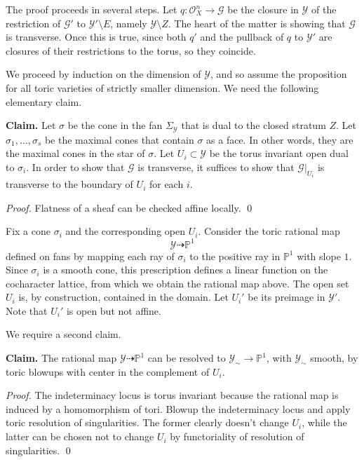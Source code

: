 \documentclass[11pt]{amsart}
\theoremstyle{definition}
\theoremstyle{definition}
\newcommand{\cG}{\mathcal{G}}
\newcommand{\cY}{\mathcal{Y}}
\newcommand{\cal}{\mathcal}
\def\cY{{\cal Y}}
\begin{document}
The proof proceeds in several steps. Let $q \colon \mathcal{O}_X^n\rightarrow \mathcal G$ be the closure in $\cY$ of the restriction of $\cG'$ to $\mathcal Y'\setminus E$, namely $\cY\setminus Z$. The heart of the matter is showing that $\mathcal G$ is transverse. Once this is true, since both $q'$ and the pullback of $q$ to $\mathcal Y'$ are closures of their restrictions to the torus, so they coincide. 

We proceed by induction on the dimension of $\cY$, and so assume the proposition for all toric varieties of strictly smaller dimension. We need the following elementary claim.

\noindent
{\bf Claim.} Let $\sigma$ be the cone in the fan $\Sigma_{\mathcal Y}$ that is dual to the closed stratum $Z$. Let $\sigma_1,\ldots, \sigma_s$ be the maximal cones that contain $\sigma$ as a face. In other words, they are the maximal cones in the star of $\sigma$. Let $U_i\subset\mathcal Y$ be the torus invariant open dual to $\sigma_i$. In order to show that $\mathcal G$ is transverse, it suffices to show that $\mathcal G|_{U_i}$ is transverse to the boundary of $U_i$ for each $i$. 

\noindent
{\it Proof.} Flatness of a sheaf can be checked affine locally. \qed

Fix a cone $\sigma_i$ and the corresponding open $U_i$. Consider the toric rational map
\[
\mathcal Y\dashrightarrow \mathbb P^1
\]
defined on fans by mapping each ray of $\sigma_i$ to the positive ray in $\mathbb P^1$ with slope $1$. Since $\sigma_i$ is a smooth cone, this prescription defines a linear function on the cocharacter lattice, from which we obtain the rational map above. The open set $U_i$ is, by construction, contained in the domain. Let $U_i'$ be its preimage in $\cY'$. Note that $U_i'$ is open but not affine. 

We require a second claim.

\noindent
{\bf Claim.} The rational map $\mathcal Y\dashrightarrow \mathbb P^1$ can be resolved to $\mathcal Y_\sim\to\mathbb P^1$, with $\mathcal Y_\sim$ smooth, by toric blowups with center in the complement of $U_i$. 

\noindent
{\it Proof.} The indeterminacy locus is torus invariant because the rational map is induced by a homomorphism of tori. Blowup the indeterminacy locus and apply toric resolution of singularities. The former clearly doesn't change $U_i$, while the latter can be chosen not to change $U_i$ by functoriality of resolution of singularities. \qed
\end{document}
